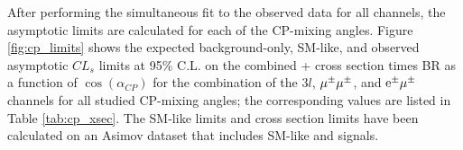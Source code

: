 After performing the simultaneous fit to the observed data for all channels, the asymptotic limits are calculated for each of the CP-mixing angles. Figure \ref{fig:cp_limits} shows the expected background-only, SM-like, and observed asymptotic $CL_s$ limits at 95\% C.L. on the combined \tH + \ttH cross section times BR as a function of $\cos(\alpha_{CP})$ for the combination of the $3l$, $\mu^\pm\mu^\pm$, and $\textrm{e}^\pm\mu^\pm$ channels for all studied CP-mixing angles; the corresponding values are listed in Table \ref{tab:cp_xsec}. The SM-like limits and cross section limits have been calculated on an Asimov dataset that includes SM-like \tH and \ttH signals. 

